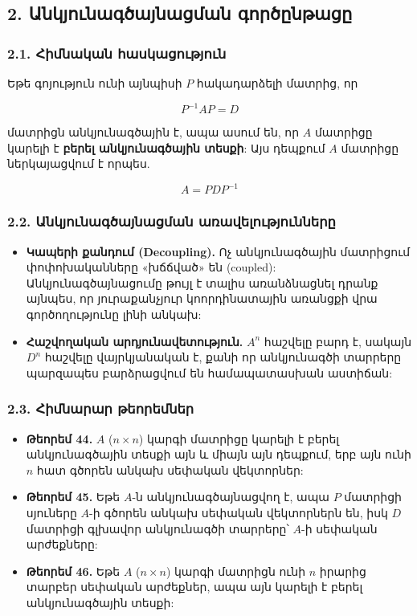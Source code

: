 \documentclass[12pt, a4paper]{article}
\begin{document}
\subsection{2. Անկյունագծայնացման գործընթացը}

\subsubsection{2.1. Հիմնական հասկացություն}

Եթե գոյություն ունի այնպիսի $P$ հակադարձելի մատրից, որ

$$
P^{-1} A P = D
$$

մատրիցն անկյունագծային է, ապա ասում են, որ $A$ մատրիցը կարելի է \textbf{բերել անկյունագծային տեսքի}: Այս դեպքում $A$ մատրիցը ներկայացվում է որպես.

$$
A = P D P^{-1}
$$

\subsubsection{2.2. Անկյունագծայնացման առավելությունները}

\begin{itemize}
    \item \textbf{Կապերի քանդում (Decoupling).} Ոչ անկյունագծային մատրիցում փոփոխականները «խճճված» են (coupled): Անկյունագծայնացումը թույլ է տալիս առանձնացնել դրանք այնպես, որ յուրաքանչյուր կոորդինատային առանցքի վրա գործողությունը լինի անկախ:
    \item \textbf{Հաշվողական արդյունավետություն.} $A^n$ հաշվելը բարդ է, սակայն $D^n$ հաշվելը վայրկյանական է, քանի որ անկյունագծի տարրերը պարզապես բարձրացվում են համապատասխան աստիճան:
\end{itemize}

\subsubsection{2.3. Հիմնարար թեորեմներ}

\begin{itemize}
    \item \textbf{Թեորեմ 44.} $A$ ($n \times n$) կարգի մատրիցը կարելի է բերել անկյունագծային տեսքի այն և միայն այն դեպքում, երբ այն ունի $n$ հատ գծորեն անկախ սեփական վեկտորներ:
    \item \textbf{Թեորեմ 45.} Եթե $A$-ն անկյունագծայնացվող է, ապա $P$ մատրիցի սյուները $A$-ի գծորեն անկախ սեփական վեկտորներն են, իսկ $D$ մատրիցի գլխավոր անկյունագծի տարրերը՝ $A$-ի սեփական արժեքները:
    \item \textbf{Թեորեմ 46.} Եթե $A$ ($n \times n$) կարգի մատրիցն ունի $n$ իրարից տարբեր սեփական արժեքներ, ապա այն կարելի է բերել անկյունագծային տեսքի:
\end{itemize}
\end{document}
